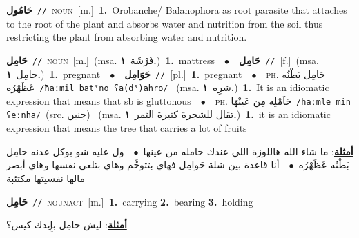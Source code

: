 \documentclass[10pt,a4paper,twoside]{article} %
\begin{document}
\begin{multicols}{2}
{\setlength\topsep{0pt}\textbf{\foreignlanguage{arabic}{حَامُول}}\ {\color{gray}\texttt{//}\color{black}}\ \textsc{noun}\ [m.]\ \textbf{1.}~Orobanche/ Balanophora as root parasite that attaches to the root of the plant and absorbs water and nutrition from the soil thus restricting the plant from absorbing water and nutrition.\ } \vspace{2mm}

{\setlength\topsep{0pt}\textbf{\foreignlanguage{arabic}{حَامِل}}\ {\color{gray}\texttt{//}\color{black}}\ \textsc{noun}\ [m.]\ \color{gray}(msa. \foreignlanguage{arabic}{فَرْشَة}~\foreignlanguage{arabic}{\textbf{١.}})\color{black}\ \textbf{1.}~mattress\ \ $\bullet$\ \ \setlength\topsep{0pt}\textbf{\foreignlanguage{arabic}{حَامِل}}\ {\color{gray}\texttt{//}\color{black}}\ [f.]\ \color{gray}(msa. \foreignlanguage{arabic}{حامِل}~\foreignlanguage{arabic}{\textbf{١.}})\color{black}\ \textbf{1.}~pregnant\ \ $\bullet$\ \ \setlength\topsep{0pt}\textbf{\foreignlanguage{arabic}{حَوَامِل}}\ {\color{gray}\texttt{//}\color{black}}\ [pl.]\ \textbf{1.}~pregnant\ \ $\bullet$\ \ \textsc{ph.} \color{gray} \foreignlanguage{arabic}{حَامِل بَطْنُه عَظَهْرُه}\color{black}\ {\color{gray}\texttt{/{\sffamily ħaːmil batˤno ʕa(dˤ)ahro}/}\color{black}}\ \color{gray} (msa. \foreignlanguage{arabic}{شرِه}~\foreignlanguage{arabic}{\textbf{١.}})\color{black}\ \textbf{1.}~It is an idiomatic expression that means that sb is gluttonous\ \ $\bullet$\ \ \textsc{ph.} \color{gray} \foreignlanguage{arabic}{حَاَمْلِه مِن عَينْهَا}\color{black}\ {\color{gray}\texttt{/{\sffamily ħaːmle min ʕeːnha}/}\color{black}}\ \color{gray}(src. \foreignlanguage{arabic}{جنين})\color{black}\ \color{gray} (msa. \foreignlanguage{arabic}{تقال للشجرة كثيرة الثمر}~\foreignlanguage{arabic}{\textbf{١.}})\color{black}\ \textbf{1.}~it is an idiomatic expression that means the tree that carries a lot of fruits\  \begin{flushright}\color{gray}\foreignlanguage{arabic}{\textbf{\underline{\foreignlanguage{arabic}{أمثلة}}}: ما شاء الله هاللوزة اللي عندك حامله من عينها\ $\bullet$\ \  ول عليه شو بوكل عدنه حامِل بَطْنُه عَظَهْرُه\ $\bullet$\ \  أنا قاعدة بين شلة حَوامِل فهاي بتتوحَّم وهاي بتلعي نفسها وهاي أبصر مالها نفسيتها مكتئبة}\end{flushright}\color{black}} \vspace{2mm}

{\setlength\topsep{0pt}\textbf{\foreignlanguage{arabic}{حَامِل}}\ {\color{gray}\texttt{//}\color{black}}\ \textsc{noun\textunderscore act}\ [m.]\ \textbf{1.}~carrying  \textbf{2.}~bearing  \textbf{3.}~holding\  \begin{flushright}\color{gray}\foreignlanguage{arabic}{\textbf{\underline{\foreignlanguage{arabic}{أمثلة}}}: ليش حامِل بإِيدك كيس؟}\end{flushright}\color{black}} \vspace{2mm}


\end{multicols}
\end{document}
